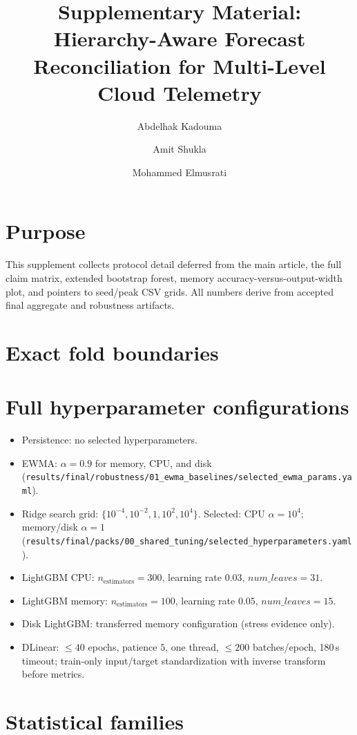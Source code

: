 \documentclass[a4paper,11pt]{article}
\title{Supplementary Material:\\
Hierarchy-Aware Forecast Reconciliation for Multi-Level Cloud Telemetry}
\author{Abdelhak Kadouma \and Amit Shukla \and Mohammed Elmusrati}
\date{}
\begin{document}
\maketitle

\section{Purpose}
This supplement collects protocol detail deferred from the main article,
the full claim matrix, extended bootstrap forest, memory
accuracy-versus-output-width plot, and pointers to seed/peak CSV grids.
All numbers derive from accepted final aggregate and robustness artifacts.

\section{Exact fold boundaries}


\section{Full hyperparameter configurations}
\begin{itemize}
  \item Persistence: no selected hyperparameters.
  \item {EWMA}: $\alpha=0.9$ for memory, {CPU}, and disk
    (\texttt{results/final/robustness/01\_ewma\_baselines/selected\_ewma\_params.yaml}).
  \item Ridge search grid: $\{10^{-4},10^{-2},1,10^{2},10^{4}\}$.
    Selected: {CPU} $\alpha=10^{4}$; memory/disk $\alpha=1$
    (\texttt{results/final/packs/00\_shared\_tuning/selected\_hyperparameters.yaml}).
  \item LightGBM {CPU}: $n_{\mathrm{estimators}}=300$, learning rate $0.03$,
    $num\_leaves=31$.
  \item LightGBM memory: $n_{\mathrm{estimators}}=100$, learning rate $0.05$,
    $num\_leaves=15$.
  \item Disk LightGBM: transferred memory configuration (stress evidence only).
  \item DLinear: $\le 40$ epochs, patience $5$, one thread,
    $\le 200$ batches/epoch, 180\,s timeout; train-only input/target
    standardization with inverse transform before metrics.
\end{itemize}

\section{Statistical families}
\end{document}
